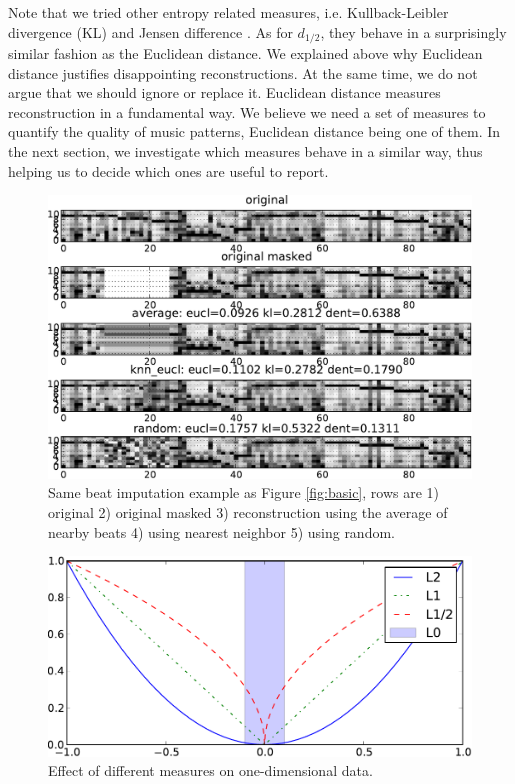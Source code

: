 \documentclass{article}
\begin{document}
Note that we tried other entropy related measures,
i.e. Kullback-Leibler divergence (KL) and Jensen difference
\cite{Michel1994}. As for $d_{1/2}$, they behave in a surprisingly
similar fashion as the Euclidean distance.  We explained above why
Euclidean distance justifies disappointing reconstructions. At the
same time, we do not argue that we should ignore or replace
it. Euclidean distance measures reconstruction in a fundamental
way. We believe we need a set of measures to quantify the quality of
music patterns, Euclidean distance being one of them. In the next
section, we investigate which measures behave in a similar way, thus
helping us to decide which ones are useful to report.

\begin{figure}[t]
\begin{center}
\includegraphics[width=.95\columnwidth]{avg_nn_rand}
\end{center}
\caption{Same beat imputation example as Figure \ref{fig:basic}, 
rows are 1) original 2) original masked
3) reconstruction using the average of nearby beats 4) using
nearest neighbor 5) using random.
\label{fig:avgnnrand}}
\end{figure}

\begin{figure}[t]
\begin{center}
\includegraphics[width=.85\columnwidth]{measures}
\end{center}
\caption{Effect of different measures on one-dimensional data.
\label{fig:measures}}
\end{figure}
\end{document}

